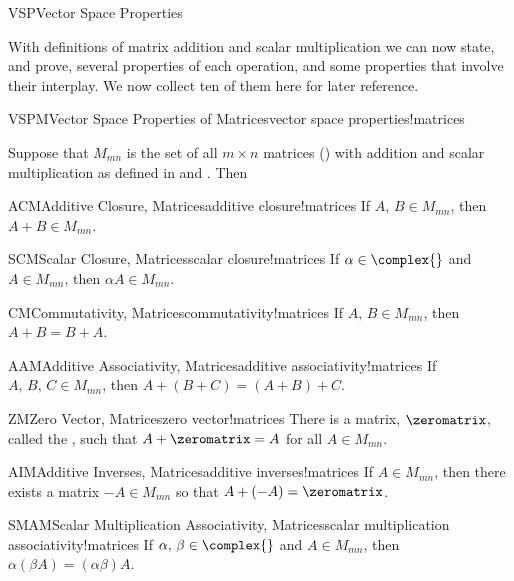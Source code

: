 \begin{subsect}{VSP}{Vector Space Properties}
%
\begin{para}With definitions of matrix addition and scalar multiplication we can now state, and prove, several properties of each operation, and some properties that involve their interplay.  We now collect ten of them here for later reference.\end{para}
%
%
\begin{theorem}{VSPM}{Vector Space Properties of Matrices}{vector space properties!matrices}
\begin{para}Suppose that $M_{mn}$ is the set of all $m\times n$ matrices () with addition and scalar multiplication as defined in  and .  Then
%
\begin{propertylist}
%
\begin{property}{ACM}{Additive Closure, Matrices}{additive closure!matrices}
If $A,\,B\in M_{mn}$, then $A+B\in M_{mn}$.\end{property}
%
\begin{property}{SCM}{Scalar Closure, Matrices}{scalar closure!matrices}
If $\alpha\in\complex{\null}$ and $A\in M_{mn}$, then $\alpha A\in M_{mn}$.\end{property}
%
\begin{property}{CM}{Commutativity, Matrices}{commutativity!matrices}
If $A,\,B\in M_{mn}$, then $A+B=B+A$.\end{property}
%
\begin{property}{AAM}{Additive Associativity, Matrices}{additive associativity!matrices}
If $A,\,B,\,C\in M_{mn}$, then $A+\left(B+C\right)=\left(A+B\right)+C$.\end{property}
%
\begin{property}{ZM}{Zero Vector, Matrices}{zero vector!matrices}
There is a matrix, $\zeromatrix$, called the , such that  $A+\zeromatrix=A$  for all $A\in M_{mn}$.\end{property}
%
\begin{property}{AIM}{Additive Inverses, Matrices}{additive inverses!matrices}
If $A\in M_{mn}$, then there exists a matrix $-A\in M_{mn}$ so that $A+(-A)=\zeromatrix$.\end{property}
%
\begin{property}{SMAM}{Scalar Multiplication Associativity, Matrices}{scalar multiplication associativity!matrices}
If $\alpha,\,\beta\in\complex{\null}$ and $A\in M_{mn}$, then $\alpha(\beta A)=(\alpha\beta)A$.\end{property}

\end{propertylist}
\end{para}
\end{theorem}
\end{subsect}
